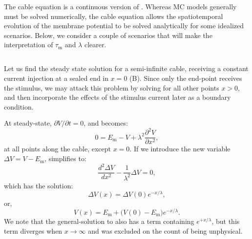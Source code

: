 The cable equation is a continuous version of . Whereas MC models generally must be solved numerically, the cable equation allows the spatiotemporal evolution of the membrane potential to be solved analytically for some idealized scenarios. Below, we consider a couple of scenarios that will  make the interpretation of $\tau_\text{m}$ and $\lambda$ clearer. 


\subsection{}
\label{sec:Neuron:cableSS}
Let us find the steady state solution for a semi-infinite cable, receiving a constant current injection at a sealed end in $x=0$ (B). Since only the end-point receives the stimulus, we may attack this problem by solving  for all other points $x>0$, and then incorporate the effects of the stimulus current later as a boundary condition. 

At steady-state, $\partial V/\partial t = 0$, and  becomes:
\begin{equation}
0 = E_\text{m}-V +  \lambda^2 \frac{\partial^2 V}{\partial x^2},
\label{eq:Neuron:semiinf}
\end{equation}
at all points along the cable, except $x=0$. If we introduce the new variable $\Delta{V}=V-E_\text{m}$,  simplifies to:
\begin{equation}
\frac{d^2 \Delta{V}}{d x^2} -  \frac{1}{\lambda^2} \Delta{V}=0, 
\label{eq:Neuron:semiinf2}
\end{equation}
which has the solution:
\begin{equation}
\Delta{V}(x) = \Delta{V}(0) e^{-x/\lambda}, 
\label{eq:Neuron:semiinf3}
\end{equation}
or, 
\begin{equation}
V(x) = E_\text{m} + \big( V(0)-E_\text{m} \big) e^{-x/\lambda}.
\label{eq:Neuron:semiinf4}
\end{equation}
We note that the general-solution to  also has a term containing $e^{+x/\lambda}$, but this term diverges when $x \rightarrow \infty$ and was excluded on the count of being unphysical.

